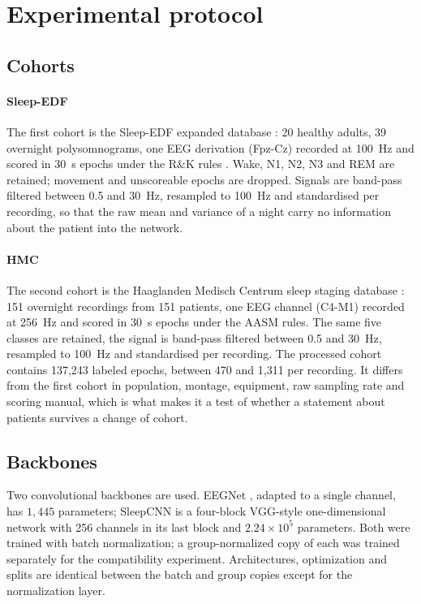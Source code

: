 \section{Experimental protocol}
\label{sec:setup}

\subsection{Cohorts}
\label{sec:cohorts}

\paragraph{Sleep-EDF}
The first cohort is the Sleep-EDF expanded database \citep{goldberger2000}: 20
healthy adults, 39 overnight polysomnograms, one EEG derivation (Fpz-Cz)
recorded at 100~Hz and scored in 30~s epochs under the R\&K rules
\citep{berry2012manual}. Wake, N1, N2, N3 and REM are retained; movement and
unscoreable epochs are dropped. Signals are band-pass filtered between 0.5 and
30~Hz, resampled to 100~Hz and standardised per recording, so that the raw mean
and variance of a night carry no information about the patient into the network.

\paragraph{HMC}
The second cohort is the Haaglanden Medisch Centrum sleep staging database
\citep{hmc2022}: 151 overnight recordings from 151 patients, one EEG channel
(C4-M1) recorded at 256~Hz and scored in 30~s epochs under the AASM rules. The
same five classes are retained, the signal is band-pass filtered between 0.5
and 30~Hz, resampled to 100~Hz and standardised per recording. The processed
cohort contains 137{,}243 labeled epochs, between 470 and 1{,}311 per
recording. It differs from the first cohort in population, montage, equipment,
raw sampling rate and scoring manual, which is what makes it a test of whether
a statement about patients survives a change of cohort.

\subsection{Backbones}

Two convolutional backbones are used. EEGNet \citep{lawhern2018}, adapted to a
single channel, has $1{,}445$ parameters; SleepCNN is a four-block VGG-style
one-dimensional network with 256 channels in its last block and
$2.24\times10^{5}$ parameters. Both were trained with batch normalization; a
group-normalized copy of each was trained separately for the compatibility
experiment. Architectures, optimization and splits are identical between the
batch and group copies except for the normalization layer.

